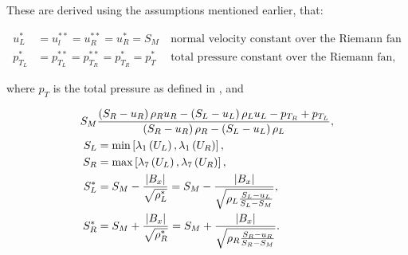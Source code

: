 These are derived using the assumptions mentioned earlier, that:

\begin{align}
u^{*}_L & = u_l^{**} = u_R^{**} = u_R^{*} = S_M\ & \text{normal velocity constant over the Riemann fan}\\
p^{*}_{T_L} & = p^{**}_{T_L} = p^{**}_{T_R} = p^{*}_{T_R} = p^{*}_{T}\ & \text{total pressure constant over the Riemann fan},
\end{align}

where $p_T$ is the total pressure as defined in , and

\begin{align}
S_M & \frac{\left( S_R -u_R\right)\rho_R u_R - \left( S_L - u_L\right)\rho_L u_L - p_{T_R} + p_{T_L}}{\left( S_R - u_R\right)\rho_R - \left( S_L - u_L\right)\rho_L},\\
S_L & = \mathrm{min}\left[\lambda_1\left( U_L\right), \lambda_1\left( U_R\right)\right],\\
S_R & = \mathrm{max}\left[\lambda_7\left( U_L\right), \lambda_7\left( U_R\right)\right],\\
S^{*}_L & = S_M - \frac{\left|B_x\right|}{\sqrt{\rho_L^{*}}} = S_M - \frac{\left|B_x\right|}{\sqrt{\rho_L\frac{S_L - u_L}{S_L - S_M}}},\\
S^{*}_R & = S_M + \frac{\left|B_x\right|}{\sqrt{\rho_R^{*}}} = S_M + \frac{\left|B_x\right|}{\sqrt{\rho_R\frac{S_R - u_R}{S_R - S_M}}}.
\end{align}


